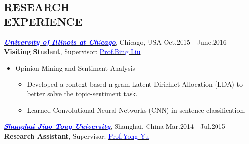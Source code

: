 \documentclass[line,margin]{res}
\begin{document}
\begin{resume}
\section{RESEARCH \\ EXPERIENCE}
        {\sl \href{http://www.uic.edu/}{\textcolor{blue}{\textbf{University of Illinois at Chicago}}}}, Chicago, USA  \hfill Oct.2015 - June.2016 \\[1mm]
        \vspace{0.1mm}
        \quad \textbf{Visiting Student}, Supervisor: {\href{https://www.cs.uic.edu/~liub/}{\textcolor{blue}{Prof.Bing Liu}}}
         \vspace{1mm}
        \begin{itemize}
            \item Opinion Mining and Sentiment Analysis
             \vspace{-2mm}
            \begin{itemize}
            \item Developed a context-based n-gram Latent Dirichlet Allocation (LDA) to better solve the topic-sentiment task.
            \vspace{-1.5mm}
            \item Learned Convolutional Neural Networks (CNN) in sentence classification.
            \end{itemize}
        \end{itemize}
        \vspace{-5mm}
        {\sl \href{http://en.sjtu.edu.cn/}{\textcolor{blue}{\textbf{Shanghai Jiao Tong University}}}}, Shanghai, China  \hfill Mar.2014 - Jul.2015 \\[1mm]
        \vspace{0.1mm}
        \quad \textbf{Research Assistant}, Supervisor: {\href{http://english.seiee.sjtu.edu.cn/english/detail/841_695.htm}{\textcolor{blue}{Prof.Yong Yu}}}

\end{resume}
\end{document}

